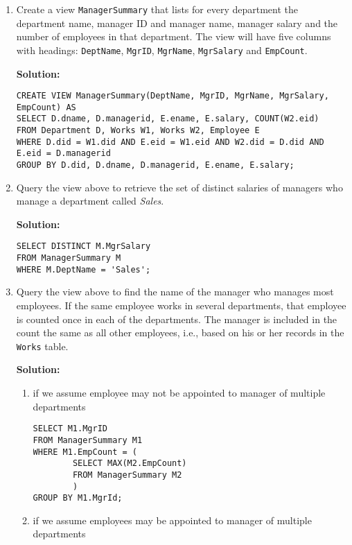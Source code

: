 \begin{enumerate}

\item Create a view \texttt{ManagerSummary} that lists for every department the department name, manager ID and manager name, manager salary and the number of employees in that department. The view will have five columns with headings: \texttt{DeptName}, \texttt{MgrID}, \texttt{MgrName}, \texttt{MgrSalary} and \texttt{EmpCount}.

\textbf{Solution:}

\begin{verbatim}
CREATE VIEW ManagerSummary(DeptName, MgrID, MgrName, MgrSalary, EmpCount) AS
SELECT D.dname, D.managerid, E.ename, E.salary, COUNT(W2.eid)
FROM Department D, Works W1, Works W2, Employee E
WHERE D.did = W1.did AND E.eid = W1.eid AND W2.did = D.did AND
E.eid = D.managerid
GROUP BY D.did, D.dname, D.managerid, E.ename, E.salary;
\end{verbatim}

\item Query the view above to retrieve the set of distinct salaries of managers who manage a department called \textit{Sales}.

\textbf{Solution:}

\begin{verbatim}
SELECT DISTINCT M.MgrSalary
FROM ManagerSummary M
WHERE M.DeptName = 'Sales';
\end{verbatim}

\item Query the view above to find the name of the manager  who manages most employees. If the same employee works in several departments, that employee is counted once in each  of the departments. The manager is included in the count the same as all other employees, i.e., based on his or her records in the \texttt{Works} table.

\textbf{Solution:}

\begin{enumerate}[label=(\alph*)]

\item if we assume employee may not be appointed to manager of multiple departments

\begin{verbatim}
SELECT M1.MgrID
FROM ManagerSummary M1
WHERE M1.EmpCount = (
		SELECT MAX(M2.EmpCount)
		FROM ManagerSummary M2
		)
GROUP BY M1.MgrId;
\end{verbatim}

\item if we assume employees may be appointed to manager of multiple departments


\end{enumerate}
\end{enumerate}
